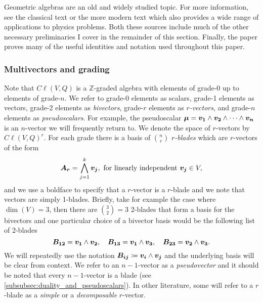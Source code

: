 Geometric algebras are an old and widely studied topic. For more information, see the classical text \cite{hestenes_clifford_1986} or the more modern text \cite{doran_geometric_2003} which also provides a wide range of applications to physics problems. Both these sources include much of the other necessary preliminaries I cover in the remainder of this section. Finally, the paper \cite{chisolm_geometric_2012} proves many of the useful identities and notation used throughout this paper.

\subsubsection{Multivectors and grading}
Note that $C\ell(V,Q)$ is a $\mathbb{Z}$-graded algebra with elements of grade-0 up to elements of grade-$n$. We refer to grade-0 elements as scalars, grade-1 elements as vectors, grade-2 elements as \emph{bivectors}, grade-$r$ elements as \emph{$r$-vectors}, and grade-$n$ elements as \emph{pseudoscalars}. For example, the pseudoscalar $\boldsymbol{\mu} = \boldsymbol{v_1} \wedge \boldsymbol{v_2} \wedge \cdots \wedge \boldsymbol{v_n}$ is an $n$-vector we will frequently return to. We denote the space of $r$-vectors by $C\ell(V,Q)^r$. For each grade there is a basis of ${n\choose r}$ \emph{$r$-blades} which are $r$-vectors of the form
\begin{equation}
\boldsymbol{A_r} = \bigwedge_{j=1}^k \boldsymbol{v_j}, ~\textrm{for linearly independent}~ \boldsymbol{v_j} \in V,
\end{equation}
and we use a boldface to specify that a $r$-vector is a $r$-blade and we note that vectors are simply 1-blades. Briefly, take for example the case where $\dim(V)=3$, then there are ${3\choose 2}=3$ 2-blades that form a basis for the bivectors and one particular choice of a bivector basis would be the following list of 2-blades
\begin{equation}
\label{eq:3_dim_basis}
\boldsymbol{B_{12}} = \boldsymbol{v_1} \wedge \boldsymbol{v_2}, \quad \boldsymbol{B_{13}} = \boldsymbol{v_1} \wedge \boldsymbol{v_3}, \quad \boldsymbol{B_{23}} = \boldsymbol{v_2} \wedge \boldsymbol{v_3}.
\end{equation}
We will repeatedly use the notation $\boldsymbol{B_{ij}} \coloneqq \boldsymbol{v_i}\wedge \boldsymbol{v_j}$ and the underlying basis will be clear from context. We refer to an $n-1$-vector as a \emph{pseudovector} and it should be noted that every $n-1$-vector is a blade (see \cref{subsubsec:duality_and_pseudoscalars}). In other literature, some will refer to a $r$-blade as a \emph{simple} or a \emph{decomposable} $r$-vector. 

